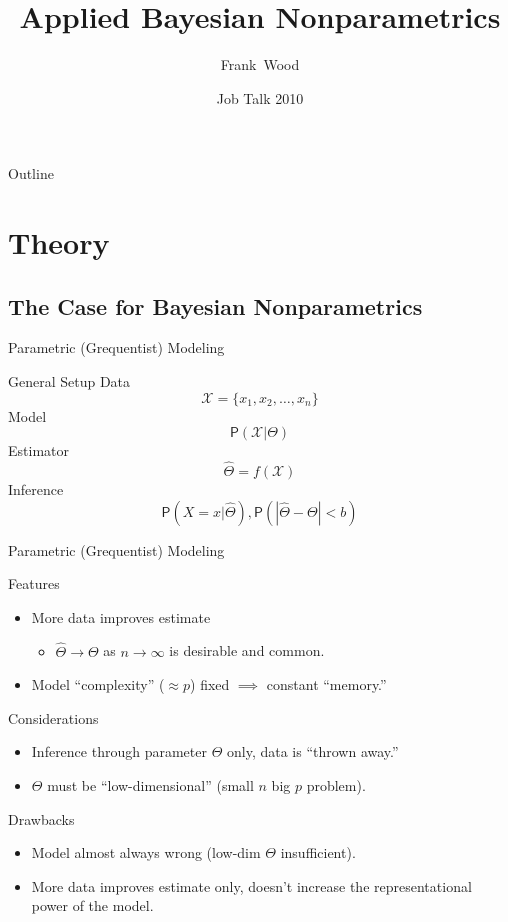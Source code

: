 \documentclass{beamer}
\title[Applied Bayesian Nonparametrics] 
{
  Applied Bayesian Nonparametrics
}
\author[Wood]
{
  Frank~Wood%
}
\institute[Columbia University]
{
  Columbia University
}
\date[Job Talk 2010]
{Job Talk 2010}
\begin{document}
\begin{frame}
  \titlepage
\end{frame}

\begin{frame}{Outline}
  \tableofcontents
\end{frame}

\section{Theory}


\subsection{The Case for Bayesian Nonparametrics}	
	
\begin{frame}[t]{Parametric (Grequentist) Modeling}
\begin{block}{General Setup}
Data 
\[\mathcal{X} = \{x_1, x_2, \ldots, x_n\}\]
Model
\[\mathsf{P}(\mathcal{X} | \Theta)\]
Estimator
\[\hat \Theta = f(\mathcal{X})\]
Inference
\[\mathsf{P}(X=x | \hat \Theta), \mathsf{P}(|\hat \Theta - \Theta| <b)\]%
\end{block}
\end{frame}	


\begin{frame}[t]{Parametric (Grequentist) Modeling}
\begin{exampleblock}{Features}
\begin{itemize}
\item More data improves estimate
\begin{itemize}
\item $\hat \Theta \rightarrow \Theta$ as $n\rightarrow \infty$ is desirable and common.
\end{itemize}
\item Model ``complexity'' ($\approx p$) fixed $\implies$ constant ``memory.''
\end{itemize}
\pause
\end{exampleblock}
\begin{block}{Considerations}
\begin{itemize}
\item Inference through parameter $\Theta$ only, data is ``thrown away.''
\item $\Theta$ must be ``low-dimensional'' (small $n$ big $p$ problem).
\end{itemize}
\end{block}
\pause
\begin{alertblock}{Drawbacks}
\begin{itemize}
\item Model almost always wrong (low-dim $\Theta$ insufficient).
\item More data improves estimate only, doesn't increase the representational power of the model.
\end{itemize}
\end{alertblock}
\end{frame}	
\end{document}
